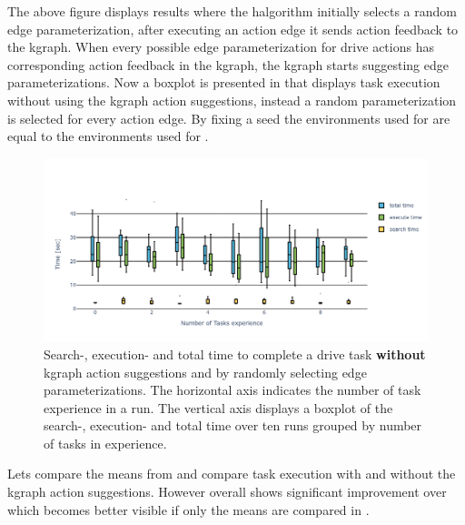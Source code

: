 The above figure displays results where the \ac{halgorithm} initially selects a random edge parameterization, after executing an action edge it sends action feedback to the \ac{kgraph}. When every possible edge parameterization for drive actions has corresponding action feedback in the \ac{kgraph}, the \ac{kgraph} starts suggesting edge parameterizations. Now a boxplot is presented in  that displays task execution without using the \ac{kgraph} action suggestions, instead a random parameterization is selected for every action edge. By fixing a seed the environments used for  are equal to the environments used for .\bs

\begin{figure}[H]
    \centering
    \includegraphics[width=\textwidth]{figures/results/random_drive_time_no_kgraph}
    \caption{Search-, execution- and total time to complete a drive task \textbf{without} \ac{kgraph} action suggestions and by randomly selecting edge parameterizations. The horizontal axis indicates the number of task experience in a run. The vertical axis displays a boxplot of the search-, execution- and total time over ten runs grouped by number of tasks in experience. }%
   \label{fig:random_drive_time_no_kgraph}
\end{figure}

Lets compare the means from  and compare task execution with and without the \ac{kgraph} action suggestions. However overall  shows significant improvement over  which becomes better visible if only the means are compared in .\bs

